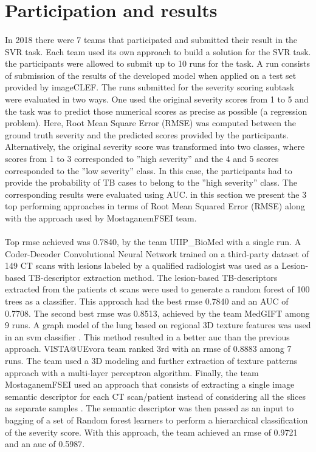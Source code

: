 \section{Participation and results}
\paragraph{}
In 2018 there were 7 teams that participated and submitted their result in the SVR task. Each team used its own approach to build a solution for the SVR task. the participants were allowed to submit up to 10 runs for the task. A run consists of submission
of the results of the developed model when applied on a test set provided by imageCLEF. The runs submitted for the severity scoring subtask were evaluated in two ways. One used the original severity scores from 1 to 5 and the task was to predict those numerical scores as precise as possible (a regression problem). Here, Root Mean Square Error (RMSE) was computed between the ground truth severity and the predicted scores provided by the participants. Alternatively, the original severity score was transformed into two classes, where scores from 1 to 3 corresponded to ”high severity” and the 4 and 5 scores corresponded to the ”low severity” class. In this case, the participants had to provide the probability of TB cases to belong to the ”high severity” class. The corresponding results were evaluated using AUC. in this section we present the 3 top performing approaches in terms of Root Mean Squared Error (RMSE) along with the approach used by MostaganemFSEI team.
\paragraph{}
Top \acs{rmse} achieved was 0.7840, by the team UIIP\_BioMed with a single run. A Coder-Decoder Convolutional Neural Network trained on a third-party dataset of 149 CT scans with lesions labeled by a qualified radiologist was used as a Lesion-based TB-descriptor extraction method. The lesion-based TB-descriptors extracted from the patients \acs{ct} scans were used to generate a random forest of 100 trees as a classifier\cite{lesionBased}. This approach had the best \acs{rmse} 0.7840 and an AUC of 0.7708. The second best \acs{rmse} was 0.8513, achieved by the team MedGIFT among 9 runs. A graph model of the lung based on regional 3D texture features was used in an \acs{svm} classifier \cite{textureBasedGraphModel}. This method resulted in a better \acs{auc} than the previous approach. VISTA@UEvora team ranked 3rd with an \acs{rmse} of 0.8883 among 7 runs. The team used a 3D modeling and further extraction of texture patterns approach with a multi-layer perceptron algorithm\cite{textureBased3DModel}.
Finally, the team MostaganemFSEI used an approach that consists of extracting a single image semantic descriptor for each CT scan/patient instead of considering all the slices as separate samples \cite{semanticDescriptor}. The semantic descriptor was then passed as an input to bagging of a set of Random forest learners to perform a hierarchical classification of the severity score. With this approach, the team achieved an \acs{rmse} of 0.9721 and an \acs{auc} of 0.5987.

